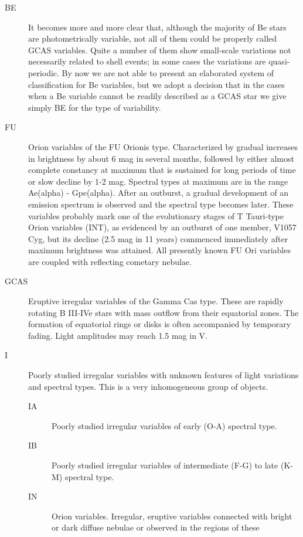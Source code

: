 \begin{description}
\item[BE]       It becomes more and more clear that, although the majority
                of Be stars are photometrically variable, not all of them could be
                properly called GCAS variables. Quite a number of them show small-scale
                variations not necessarily related to shell events; in some cases the
                variations are quasi-periodic. By now we are not able to present an
                elaborated system of classification for Be variables, but we adopt a
                decision that in the cases when a Be variable cannot be readily
                described as a GCAS star we give simply BE for the type of variability.
\item[FU]		Orion variables of the FU Orionis type. Characterized by
				gradual increases in brightness by about 6 mag in several months,
				followed by either almost complete constancy at maximum that is
				sustained for long periods of time or slow decline by 1-2 mag. Spectral
				types at maximum are in the range Ae(alpha) - Gpe(alpha). After an
				outburst, a gradual development of an emission spectrum is observed and
				the spectral type becomes later. These variables probably mark one of
				the evolutionary stages of T Tauri-type Orion variables (INT), as
				evidenced by an outburst of one member, V1057 Cyg, but its decline (2.5
				mag in 11 years) commenced immediately after maximum brightness was
				attained. All presently known FU Ori variables are coupled with
				reflecting cometary nebulae.
\item[GCAS]		Eruptive irregular variables of the Gamma Cas type.
				These are rapidly rotating B III-IVe stars with mass outflow from their
				equatorial zones. The formation of equatorial rings or disks is often
				accompanied by temporary fading. Light amplitudes may reach 1.5 mag in V.
\item[I]		Poorly studied irregular variables with unknown features of
				light variations and spectral types. This is a very inhomogeneous group
				of objects.
	\begin{description}
\item[IA] 		Poorly studied irregular variables of early (O-A) spectral
				type.
\item[IB]		Poorly studied irregular variables of intermediate (F-G)
				to late (K-M) spectral type.
\item[IN]		Orion variables. Irregular, eruptive variables connected
				with bright or dark diffuse nebulae or observed in the regions of these

\end{description}
\end{description}

